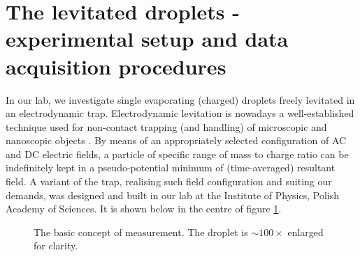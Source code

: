 \documentclass[12pt,dvips]{elsarticle}
\begin{document}
\section{The levitated droplets - experimental setup and data acquisition procedures}
In our lab, we investigate single evaporating (charged) droplets freely levitated in an electrodynamic trap.
Electrodynamic levitation is nowadays a well-established technique used for non-contact trapping (and handling) of
microscopic and nanoscopic objects \cite{Major}. By means of an appropriately selected configuration of AC and DC electric
fields, a particle of specific range of mass to charge ratio can be indefinitely kept in a pseudo-potential minimum of
(time-averaged) resultant field. A variant of the trap, realising such field configuration and suiting our demands, was
designed and built in our lab at the Institute of Physics, Polish Academy of Sciences. It is shown below in the centre of
figure \ref{concept}.

\begin{figure}[h!t!b!]
\begin{center}
\end{center}
\caption{The basic concept of measurement. The droplet is $\sim 100\times$ enlarged for clarity.}\label{concept}
\end{figure}
\end{document}
